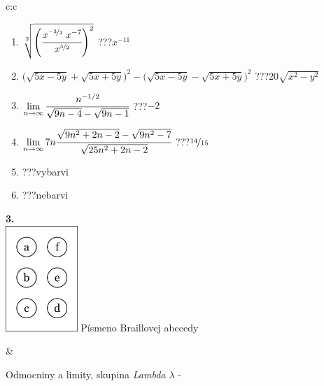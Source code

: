 \documentclass[10pt]{report}
\begin{document}
\begin{tabular}{c:c}
\begin{minipage}[c][104.5mm][t]{0.5\linewidth}
\begin{center}
\begin{minipage}{0.79\linewidth}
\begin{center}
\begin{varwidth}{\linewidth}
\begin{enumerate}
\small
\item $\sqrt[2]{\left(\cfrac{x^{\nicefrac{-3}{2}}\;x^{-7}}{x^{\nicefrac{5}{2}}}\right)^{2}}$\quad \dotfill\; ???\;\dotfill \quad $x^{-11}$
\item {\footnotesize{\scriptsize$\big(\sqrt{5x-5y}+\sqrt{5x+5y}\big)^2-\big(\sqrt{5x-5y}-\sqrt{5x+5y}\big)^2$}\quad \dotfill\; ???\;\dotfill \quad $20\sqrt{x^2-y^2}$}
\item $\lim\limits_{n\to\infty}\cfrac{n^{-1/2}}{\sqrt{9n-4}-\sqrt{9n-1}}$\quad \dotfill\; ???\;\dotfill \quad $-2$
\item $\lim\limits_{n\to\infty}7n\cfrac{\sqrt{9n^2+2n-2}-\sqrt{9n^2-7}}{\sqrt{25n^2+2n-2}}$\quad \dotfill\; ???\;\dotfill \quad $\nicefrac{14}{15}$
\item \quad \dotfill\; ???\;\dotfill \quad vybarvi
\item \quad \dotfill\; ???\;\dotfill \quad nebarvi
\end{enumerate}
\end{varwidth}
\end{center}
\end{minipage}
\begin{minipage}{0.20\linewidth}
\begin{center}
{\Huge\bfseries 3.} \\[2mm]
\includegraphics[height=40mm]{../images/braille.png}
{\small Písmeno Braillovej abecedy}
\end{center}
\end{minipage}
\end{center}
\end{minipage}
&
\begin{minipage}[c][104.5mm][t]{0.5\linewidth}
\begin{center}
\vspace{7mm}
{\huge Odmocniny a limity, skupina \textit{Lambda $\lambda$} -}\\[5mm]

\end{center}
\end{minipage}
\end{tabular}
\end{document}
